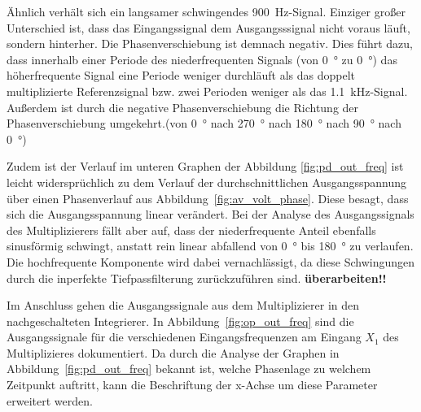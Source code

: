 \documentclass[../main.tex]{subfiles}
\begin{document}
Ähnlich verhält sich ein langsamer schwingendes \SI{900}{\hertz}-Signal. Einziger großer Unterschied ist, dass das Eingangssignal dem Ausgangsssignal nicht voraus läuft, sondern hinterher. Die Phasenverschiebung ist demnach negativ. Dies führt dazu, dass innerhalb einer Periode des niederfrequenten Signals (von \SI{0}{\degree} zu \SI{0}{\degree}) das höherfrequente Signal eine Periode weniger durchläuft als das doppelt multiplizierte Referenzsignal bzw. zwei Perioden weniger als das \SI{1.1}{\kilo\hertz}-Signal. Außerdem ist durch die negative Phasenverschiebung die Richtung der Phasenverschiebung umgekehrt.(von \SI{0}{\degree} nach \SI{270}{\degree} nach \SI{180}{\degree} nach \SI{90}{\degree} nach \SI{0}{\degree}) \par
\medskip


Zudem ist der Verlauf im unteren Graphen der Abbildung \ref{fig:pd_out_freq} ist leicht widersprüchlich zu dem Verlauf der durchschnittlichen Ausgangsspannung über einen Phasenverlauf aus Abbildung~\ref{fig:av_volt_phase}. Diese besagt, dass sich die Ausgangsspannung linear verändert. Bei der Analyse des Ausgangssignals des Multiplizierers fällt aber auf, dass der niederfrequente Anteil ebenfalls sinusförmig schwingt, anstatt rein linear abfallend von \SI{0}{\degree} bis \SI{180}{\degree} zu verlaufen. Die hochfrequente Komponente wird dabei vernachlässigt, da diese Schwingungen durch die inperfekte Tiefpassfilterung zurückzuführen sind. \textbf{überarbeiten!!}\par
\medskip

Im Anschluss gehen die Ausgangssignale aus dem Multiplizierer in den nachgeschalteten Integrierer. In Abbildung~\ref{fig:op_out_freq} sind die Ausgangssignale für die verschiedenen Eingangsfrequenzen am Eingang $X_1$ des Multiplizieres dokumentiert. Da durch die Analyse der Graphen in Abbildung~\ref{fig:pd_out_freq} bekannt ist, welche Phasenlage zu welchem Zeitpunkt auftritt, kann die Beschriftung der x-Achse um diese Parameter erweitert werden. \par
\end{document}
